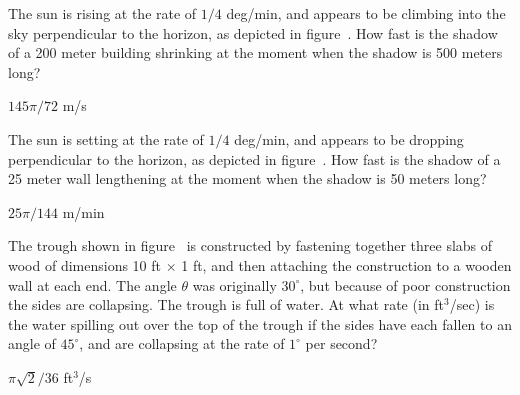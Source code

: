 \begin{exercises}
\begin{exercise}
The sun is rising at the rate of $1/4$ deg/min, and appears to be
climbing into the sky perpendicular to the
horizon, as depicted in figure~.
How fast is the shadow of a 200 meter building
shrinking at the moment when the shadow is 500 meters long? 
\begin{answer} $145\pi/72$ m/s
\end{answer}\end{exercise}

\begin{exercise} The sun is setting at the rate of $1/4$ deg/min, and appears
to be dropping perpendicular to the horizon, as depicted in
figure~. How fast is the shadow of a 25
meter wall lengthening at the moment when the shadow is 50 meters long?
\begin{answer} $25\pi/144$ m/min
\end{answer}\end{exercise}




\begin{exercise}
The trough shown in figure~
is constructed by fastening together three
slabs of wood of dimensions 10 ft $\times$ 1 ft, and then attaching the
construction to a wooden wall at each end.  The angle $\theta$ was
originally $30^\circ$, but because of poor construction the sides are
collapsing.  The trough is full of water.  At what rate (in ft${}^3$/sec) 
is 
the water spilling out over the top of
the trough if the sides have each fallen to an angle of $45^\circ$, and are
collapsing at the rate of $1^\circ$ per second?
\begin{answer} $\pi\sqrt2/36$ ft$^3$/s
\end{answer}\end{exercise}


\end{exercises}
